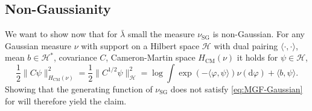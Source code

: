 \documentclass[11pt, a4paper]{scrartcl}
\numberwithin{equation}{section}
\theoremstyle{plain}
\theoremstyle{remark}
\newcommand{\mathd}{\mathrm{d}}
\newcommand{\tmop}[1]{\ensuremath{\operatorname{#1}}}
\begin{document}
\subsection{Non-Gaussianity}\label{sec:non-Gaussian}

We want to show now that for $\bar{\lambda}$ small the measure $\nu_{\tmop{SG}}$ is
non-Gaussian. For any Gaussian measure $\nu$ with support on a Hilbert space
$\mathcal{H}$ with dual pairing $\langle\cdot,\cdot\rangle$, mean $b \in \mathcal{H}^\ast$, covariance $C$, Cameron-Martin space
$H_{\tmop{CM}}(\nu)$ it holds for $\psi\in \mathcal{H}$,
\begin{equation}
	\frac{1}{2}\|C \psi\|_{H_{\tmop{CM}}(\nu)}^2=\frac{1}{2} \|C^{1/2} \psi\|^2_{\mathcal{H}} = \log\int \exp(-\langle \varphi,\psi\rangle)
	\nu(\mathd \varphi) + \langle b,\psi \rangle.\label{eq:MGF-Gaussian}
\end{equation}
Showing that the generating function of $\nu_{\tmop{SG}}$ does not satisfy
\eqref{eq:MGF-Gaussian} for will therefore yield the claim.
\end{document}
